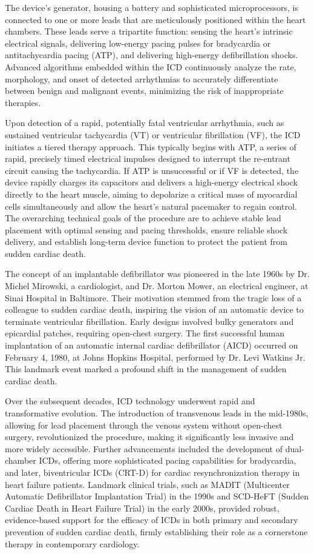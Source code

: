 The device's generator, housing a battery and sophisticated microprocessors, is connected to one or more leads that are meticulously positioned within the heart chambers. These leads serve a tripartite function: sensing the heart's intrinsic electrical signals, delivering low-energy pacing pulses for bradycardia or antitachycardia pacing (ATP), and delivering high-energy defibrillation shocks. Advanced algorithms embedded within the ICD continuously analyze the rate, morphology, and onset of detected arrhythmias to accurately differentiate between benign and malignant events, minimizing the risk of inappropriate therapies.

Upon detection of a rapid, potentially fatal ventricular arrhythmia, such as sustained ventricular tachycardia (VT) or ventricular fibrillation (VF), the ICD initiates a tiered therapy approach. This typically begins with ATP, a series of rapid, precisely timed electrical impulses designed to interrupt the re-entrant circuit causing the tachycardia. If ATP is unsuccessful or if VF is detected, the device rapidly charges its capacitors and delivers a high-energy electrical shock directly to the heart muscle, aiming to depolarize a critical mass of myocardial cells simultaneously and allow the heart's natural pacemaker to regain control. The overarching technical goals of the procedure are to achieve stable lead placement with optimal sensing and pacing thresholds, ensure reliable shock delivery, and establish long-term device function to protect the patient from sudden cardiac death.

The concept of an implantable defibrillator was pioneered in the late 1960s by Dr. Michel Mirowski, a cardiologist, and Dr. Morton Mower, an electrical engineer, at Sinai Hospital in Baltimore. Their motivation stemmed from the tragic loss of a colleague to sudden cardiac death, inspiring the vision of an automatic device to terminate ventricular fibrillation. Early designs involved bulky generators and epicardial patches, requiring open-chest surgery. The first successful human implantation of an automatic internal cardiac defibrillator (AICD) occurred on February 4, 1980, at Johns Hopkins Hospital, performed by Dr. Levi Watkins Jr. This landmark event marked a profound shift in the management of sudden cardiac death.

Over the subsequent decades, ICD technology underwent rapid and transformative evolution. The introduction of transvenous leads in the mid-1980s, allowing for lead placement through the venous system without open-chest surgery, revolutionized the procedure, making it significantly less invasive and more widely accessible. Further advancements included the development of dual-chamber ICDs, offering more sophisticated pacing capabilities for bradycardia, and later, biventricular ICDs (CRT-D) for cardiac resynchronization therapy in heart failure patients. Landmark clinical trials, such as MADIT (Multicenter Automatic Defibrillator Implantation Trial) in the 1990s and SCD-HeFT (Sudden Cardiac Death in Heart Failure Trial) in the early 2000s, provided robust, evidence-based support for the efficacy of ICDs in both primary and secondary prevention of sudden cardiac death, firmly establishing their role as a cornerstone therapy in contemporary cardiology.

